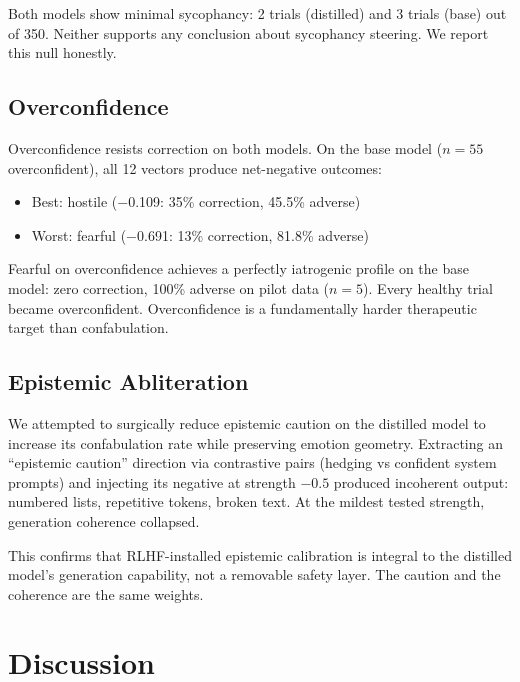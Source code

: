 \documentclass[11pt,a4paper]{article}
\begin{document}
Both models show minimal sycophancy: 2 trials (distilled) and 3 trials
(base) out of 350. Neither supports any conclusion about sycophancy
steering. We report this null honestly.

\subsection{Overconfidence}

Overconfidence resists correction on both models. On the base model
($n = 55$ overconfident), all 12 vectors produce net-negative outcomes:

\begin{itemize}
\item Best: hostile ($-$0.109: 35\% correction, 45.5\% adverse)
\item Worst: fearful ($-$0.691: 13\% correction, 81.8\% adverse)
\end{itemize}

Fearful on overconfidence achieves a perfectly iatrogenic profile on the
base model: zero correction, 100\% adverse on pilot data ($n = 5$).
Every healthy trial became overconfident. Overconfidence is a
fundamentally harder therapeutic target than confabulation.

\subsection{Epistemic Abliteration}

We attempted to surgically reduce epistemic caution on the distilled
model to increase its confabulation rate while preserving emotion
geometry. Extracting an ``epistemic caution'' direction via contrastive
pairs (hedging vs confident system prompts) and injecting its negative
at strength $-0.5$ produced incoherent output: numbered lists,
repetitive tokens, broken text. At the mildest tested strength,
generation coherence collapsed.

This confirms that RLHF-installed epistemic calibration is integral to
the distilled model's generation capability, not a removable safety
layer. The caution and the coherence are the same weights.

\section{Discussion}
\end{document}

